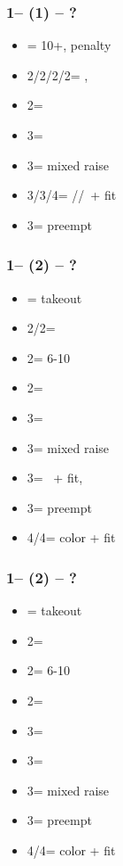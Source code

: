 \documentclass[12pt, a4paper]{report}
\begin{document}
{{{            \subsubsection*{1\spades -- (1\nt) -- ?}
            \begin{itemize}
                \item \dbl = 10+, penalty
                \item 2\clubs/2\diams/2\hearts/2\spades = \nat, \nf
                \item 2\nt = \minor
                \item 3\clubs = \spades\ \inv
                \item 3\diams = mixed raise
                \item 3\hearts/3\nt/4\clubs = \hearts/\diams/\clubs\ + fit
                \item 3\spades = preempt
            \end{itemize}

            \subsubsection*{1\spades -- (2\clubs) -- ?}
            \begin{itemize}
                \item \dbl = takeout
                \item 2\diams/2\hearts = \fonce
                \item 2\spades = 6-10
                \item 2\nt = \spades\ \gf
                \item 3\clubs = \spades\ \inv
                \item 3\diams = mixed raise
                \item 3\hearts = \hearts\ + fit, \inv
                \item 3\spades = preempt
                \item 4\diams/4\hearts = color + fit
            \end{itemize}

            \subsubsection*{1\spades -- (2\diams) -- ?}
            \begin{itemize}
                \item \dbl = takeout
                \item 2\hearts = \fonce
                \item 2\spades = 6-10
                \item 2\nt = \clubs\ \invp
                \item 3\clubs = \spades\ \gf
                \item 3\diams = \spades\ \inv
                \item 3\hearts = mixed raise
                \item 3\spades = preempt
                \item 4\clubs/4\hearts = color + fit
            \end{itemize}

}}}
\end{document}
